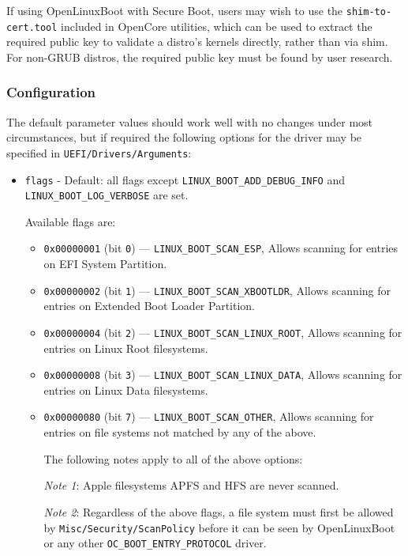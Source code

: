 \documentclass[]{article}
\providecommand{\tightlist}{%
  \setlength{\itemsep}{0pt}\setlength{\parskip}{0pt}}
\begin{document}
If using OpenLinuxBoot with Secure Boot, users may wish to use the \texttt{shim-to-cert.tool} included in OpenCore
utilities, which can be used to extract the required public key to validate a distro's kernels directly, rather
than via shim. For non-GRUB distros, the required public key must be found by user research.

\subsubsection{Configuration}

The default parameter values should work well with no changes under most circumstances, but if required the following
options for the driver may be specified in \texttt{UEFI/Drivers/Arguments}:

\begin{itemize}
  \tightlist
	\item \texttt{flags} - Default: all flags except \texttt{LINUX\_BOOT\_ADD\_DEBUG\_INFO} and
  \texttt{LINUX\_BOOT\_LOG\_VERBOSE} are set. \medskip

	Available flags are: \medskip

  \begin{itemize}
  \tightlist
    \item \texttt{0x00000001} (bit \texttt{0}) --- \texttt{LINUX\_BOOT\_SCAN\_ESP},
    Allows scanning for entries on EFI System Partition.
    \item \texttt{0x00000002} (bit \texttt{1}) --- \texttt{LINUX\_BOOT\_SCAN\_XBOOTLDR},
    Allows scanning for entries on Extended Boot Loader Partition.
	  \item \texttt{0x00000004} (bit \texttt{2}) --- \texttt{LINUX\_BOOT\_SCAN\_LINUX\_ROOT},
	  Allows scanning for entries on Linux Root filesystems.
	  \item \texttt{0x00000008} (bit \texttt{3}) --- \texttt{LINUX\_BOOT\_SCAN\_LINUX\_DATA},
	  Allows scanning for entries on Linux Data filesystems.
	  \item \texttt{0x00000080} (bit \texttt{7}) --- \texttt{LINUX\_BOOT\_SCAN\_OTHER},
	  Allows scanning for entries on file systems not matched by any of the above. \medskip

	  The following notes apply to all of the above options: \medskip

	  \emph{Note 1}: Apple filesystems APFS and HFS are never scanned.
    \medskip

	  \emph{Note 2}: Regardless of the above flags, a file system must first be
	  allowed by \texttt{Misc/Security/ScanPolicy} before it can be seen by
    OpenLinuxBoot or any other \texttt{OC\_BOOT\_ENTRY\_PROTOCOL} driver.
    \medskip


\end{itemize}
\end{itemize}
\end{document}
